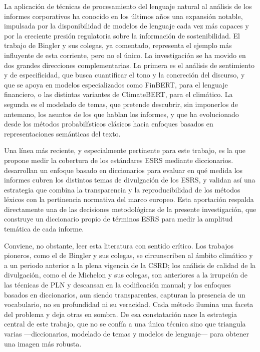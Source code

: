 La aplicación de técnicas de procesamiento del lenguaje natural al análisis de los informes
corporativos ha conocido en los últimos años una expansión notable, impulsada por la
disponibilidad de modelos de lenguaje cada vez más capaces y por la creciente presión
regulatoria sobre la información de sostenibilidad. El trabajo de Bingler y sus colegas, ya
comentado, representa el ejemplo más influyente de esta corriente, pero no el único. La
investigación se ha movido en dos grandes direcciones complementarias. La primera es el
análisis de sentimiento y de especificidad, que busca cuantificar el tono y la concreción del
discurso, y que se apoya en modelos especializados como FinBERT, para el lenguaje financiero,
o las distintas variantes de ClimateBERT, para el climático. La segunda es el modelado de
temas, que pretende descubrir, sin imponerlos de antemano, los asuntos de los que hablan los
informes, y que ha evolucionado desde los métodos probabilísticos clásicos hacia enfoques
basados en representaciones semánticas del texto.

Una línea más reciente, y especialmente pertinente para este trabajo, es la que propone medir
la cobertura de los estándares ESRS mediante diccionarios. \textcite{suta2025} desarrollan un
enfoque basado en diccionarios para evaluar en qué medida los informes cubren los distintos
temas de divulgación de los ESRS, y validan así una estrategia que combina la transparencia y
la reproducibilidad de los métodos léxicos con la pertinencia normativa del marco europeo.
Esta aportación respalda directamente una de las decisiones metodológicas de la presente
investigación, que construye un diccionario propio de términos ESRS para medir la amplitud
temática de cada informe.

Conviene, no obstante, leer esta literatura con sentido crítico. Los trabajos pioneros, como
el de Bingler y sus colegas, se circunscriben al ámbito climático y a un periodo anterior a la
plena vigencia de la CSRD; los análisis de calidad de la divulgación, como el de Michelon y
sus colegas, son anteriores a la irrupción de las técnicas de PLN y descansan en la
codificación manual; y los enfoques basados en diccionarios, aun siendo transparentes,
capturan la presencia de un vocabulario, no su profundidad ni su veracidad. Cada método ilumina
una faceta del problema y deja otras en sombra. De esa constatación nace la estrategia central
de este trabajo, que no se confía a una única técnica sino que triangula varias —diccionarios,
modelado de temas y modelos de lenguaje— para obtener una imagen más robusta.

